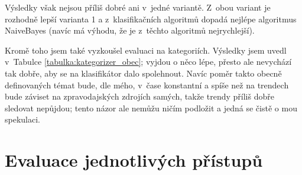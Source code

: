 \documentclass[12pt,a4paper]{report}
\begin{document}
Výsledky však nejsou příliš dobré ani v~jedné variantě. Z~obou variant je rozhodně lepší varianta 1 a z~klasifikačních algoritmů dopadá nejlépe algoritmus NaiveBayes (navíc má výhodu, že je z~těchto algoritmů nejrychlejší).



Kromě toho jsem také vyzkoušel evaluaci na  kategoriích. Výsledky jsem uvedl v~Tabulce \ref{tabulka:kategorizer_obec}; vyjdou o něco lépe, přesto ale nevychází tak dobře, aby se na klasifikátor dalo spolehnout. Navíc poměr takto obecně definovaných témat bude, dle mého, v~čase konstantní a spíše než na trendech bude záviset na zpravodajských zdrojích samých, takže trendy příliš dobře sledovat nepůjdou; tento názor ale nemůžu ničím podložit a jedná se čistě o mou spekulaci.

\section{Evaluace jednotlivých přístupů}
\end{document}
